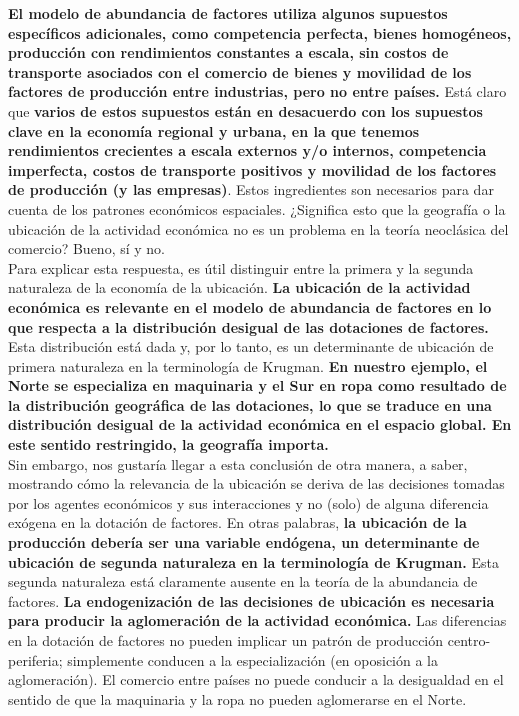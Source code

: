 \textbf{El modelo de abundancia de factores utiliza algunos supuestos específicos adicionales, como competencia perfecta, bienes homogéneos, producción con rendimientos constantes a escala, sin costos de transporte asociados con el comercio de bienes y movilidad de los factores de producción entre industrias, pero no entre países.} Está claro que \textbf{varios de estos supuestos están en desacuerdo con los supuestos clave en la economía regional y urbana, en la que tenemos rendimientos crecientes a escala externos y/o internos, competencia imperfecta, costos de transporte positivos y movilidad de los factores de producción (y las empresas)}. Estos ingredientes son necesarios para dar cuenta de los patrones económicos espaciales. ¿Significa esto que la geografía o la ubicación de la actividad económica no es un problema en la teoría neoclásica del comercio? Bueno, sí y no.\\
Para explicar esta respuesta, es útil distinguir entre la primera y la segunda naturaleza de la economía de la ubicación. \textbf{La ubicación de la actividad económica es relevante en el modelo de abundancia de factores en lo que respecta a la distribución desigual de las dotaciones de factores.} Esta distribución está dada y, por lo tanto, es un determinante de ubicación de primera naturaleza en la terminología de Krugman. \textbf{En nuestro ejemplo, el Norte se especializa en maquinaria y el Sur en ropa como resultado de la distribución geográfica de las dotaciones, lo que se traduce en una distribución desigual de la actividad económica en el espacio global. En este sentido restringido, la geografía importa.}\\
Sin embargo, nos gustaría llegar a esta conclusión de otra manera, a saber, mostrando cómo la relevancia de la ubicación se deriva de las decisiones tomadas por los agentes económicos y sus interacciones y no (solo) de alguna diferencia exógena en la dotación de factores. En otras palabras, \textbf{la ubicación de la producción debería ser una variable endógena, un determinante de ubicación de segunda naturaleza en la terminología de Krugman.} Esta segunda naturaleza está claramente ausente en la teoría de la abundancia de factores. \textbf{La endogenización de las decisiones de ubicación es necesaria para producir la aglomeración de la actividad económica.} Las diferencias en la dotación de factores no pueden implicar un patrón de producción centro-periferia; simplemente conducen a la especialización (en oposición a la aglomeración). El comercio entre países no puede conducir a la desigualdad en el sentido de que la maquinaria y la ropa no pueden aglomerarse en el Norte.\\
